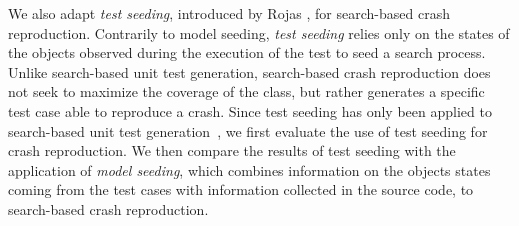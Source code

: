 %

We also adapt \emph{test seeding}, introduced by Rojas \etal, for search-based crash reproduction. Contrarily to model seeding, \emph{test seeding} relies only on the states of the objects observed during the execution of the test to seed a search process. Unlike search-based unit test generation, search-based crash reproduction does not seek to maximize the coverage of the class, but rather generates a specific test case able to reproduce a crash. Since test seeding has only been applied to search-based unit test generation~\cite{Rojas2016}, we first evaluate the use of test seeding for crash reproduction.  We then compare the results of test seeding with the application of \emph{model seeding}, which combines information on the objects states coming from the test cases with information collected in the source code, to search-based crash reproduction. 

